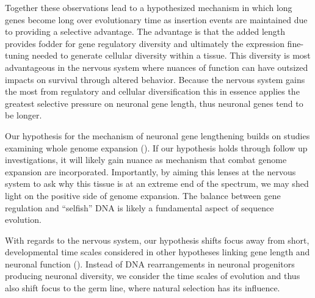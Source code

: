 Together these observations lead to a hypothesized mechanism in which long genes become long over evolutionary time as insertion events are maintained due to providing a selective advantage. The advantage is that the added length provides fodder for gene regulatory diversity and ultimately the expression fine-tuning needed to generate cellular diversity within a tissue. This diversity is most advantageous in the nervous system where nuances of function can have outsized impacts on survival through altered behavior. Because the nervous system gains the most from regulatory and cellular diversification this in essence applies the greatest selective pressure on neuronal gene length, thus neuronal genes tend to be longer. 

Our hypothesis for the mechanism of neuronal gene lengthening builds on studies examining whole genome expansion (). If our hypothesis holds through follow up investigations, it will likely gain nuance as mechanism that combat genome expansion are incorporated. Importantly, by aiming this lenses at the nervous system to ask why this tissue is at an extreme end of the spectrum, we may shed light on the positive side of genome expansion. The balance between gene regulation and “selfish” DNA is likely a fundamental aspect of sequence evolution. 

With regards to the nervous system, our hypothesis shifts focus away from short, developmental time scales considered in other hypotheses linking gene length and neuronal function (). Instead of DNA rearrangements in neuronal progenitors producing neuronal diversity, we consider the time scales of evolution and thus also shift focus to the germ line, where natural selection has its influence. 

